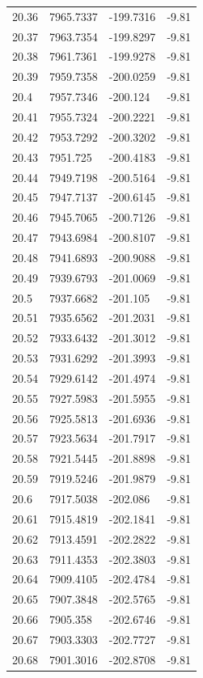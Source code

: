 \begin{table}[H]
\begin{tabular}{llll}
20.36 & 7965.7337 & -199.7316 & -9.81 \\
20.37 & 7963.7354 & -199.8297 & -9.81 \\
20.38 & 7961.7361 & -199.9278 & -9.81 \\
20.39 & 7959.7358 & -200.0259 & -9.81 \\
20.4 & 7957.7346 & -200.124 & -9.81 \\
20.41 & 7955.7324 & -200.2221 & -9.81 \\
20.42 & 7953.7292 & -200.3202 & -9.81 \\
20.43 & 7951.725 & -200.4183 & -9.81 \\
20.44 & 7949.7198 & -200.5164 & -9.81 \\
20.45 & 7947.7137 & -200.6145 & -9.81 \\
20.46 & 7945.7065 & -200.7126 & -9.81 \\
20.47 & 7943.6984 & -200.8107 & -9.81 \\
20.48 & 7941.6893 & -200.9088 & -9.81 \\
20.49 & 7939.6793 & -201.0069 & -9.81 \\
20.5 & 7937.6682 & -201.105 & -9.81 \\
20.51 & 7935.6562 & -201.2031 & -9.81 \\
20.52 & 7933.6432 & -201.3012 & -9.81 \\
20.53 & 7931.6292 & -201.3993 & -9.81 \\
20.54 & 7929.6142 & -201.4974 & -9.81 \\
20.55 & 7927.5983 & -201.5955 & -9.81 \\
20.56 & 7925.5813 & -201.6936 & -9.81 \\
20.57 & 7923.5634 & -201.7917 & -9.81 \\
20.58 & 7921.5445 & -201.8898 & -9.81 \\
20.59 & 7919.5246 & -201.9879 & -9.81 \\
20.6 & 7917.5038 & -202.086 & -9.81 \\
20.61 & 7915.4819 & -202.1841 & -9.81 \\
20.62 & 7913.4591 & -202.2822 & -9.81 \\
20.63 & 7911.4353 & -202.3803 & -9.81 \\
20.64 & 7909.4105 & -202.4784 & -9.81 \\
20.65 & 7907.3848 & -202.5765 & -9.81 \\
20.66 & 7905.358 & -202.6746 & -9.81 \\
20.67 & 7903.3303 & -202.7727 & -9.81 \\
20.68 & 7901.3016 & -202.8708 & -9.81 \\

\end{tabular}
\end{table}
